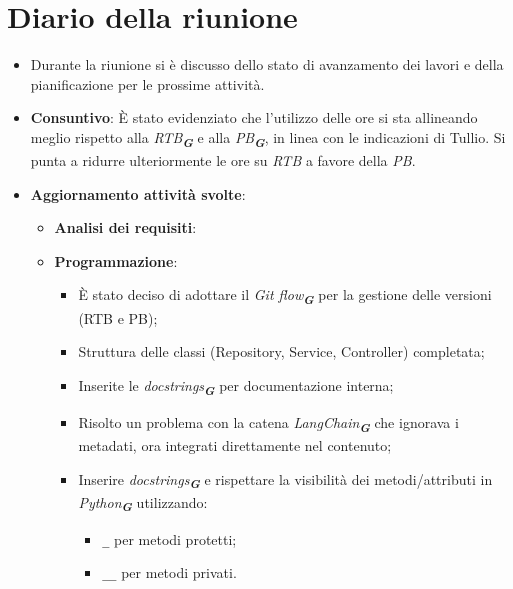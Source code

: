 
\section{Diario della riunione}

\begin{itemize}
    \item Durante la riunione si è discusso dello stato di avanzamento dei lavori e della pianificazione per le prossime attività.  

    \item \textbf{Consuntivo}:  
    È stato evidenziato che l'utilizzo delle ore si sta allineando meglio rispetto alla \emph{RTB}\textsubscript{\textit{\textbf{G}}} e alla \emph{PB}\textsubscript{\textit{\textbf{G}}}, in linea con le indicazioni di Tullio. Si punta a ridurre ulteriormente le ore su \emph{RTB} a favore della \emph{PB}.  

    \item \textbf{Aggiornamento attività svolte}:  
    \begin{itemize}
        \item \textbf{Analisi dei requisiti}:  

        \item \textbf{Programmazione}:  
        \begin{itemize}
            \item È stato deciso di adottare il \emph{Git flow}\textsubscript{\textit{\textbf{G}}} per la gestione delle versioni (RTB e PB);
            \item Struttura delle classi (Repository, Service, Controller) completata;
            \item Inserite le \emph{docstrings}\textsubscript{\textit{\textbf{G}}} per documentazione interna;
            \item Risolto un problema con la catena \emph{LangChain}\textsubscript{\textit{\textbf{G}}} che ignorava i metadati, ora integrati direttamente nel contenuto;
            \item Inserire \emph{docstrings}\textsubscript{\textit{\textbf{G}}} e rispettare la visibilità dei metodi/attributi in \emph{Python}\textsubscript{\textit{\textbf{G}}} utilizzando:  
            \begin{itemize}
                \item \texttt{\_} per metodi protetti;
                \item \texttt{\_\_} per metodi privati.  
            \end{itemize}
        \end{itemize}


\end{itemize}
\end{itemize}
